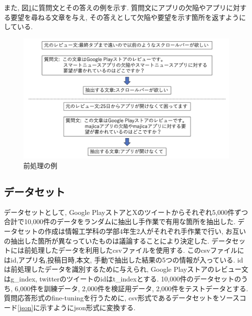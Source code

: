 また, 図\ref{chap:answer}に質問文とその答えの例を示す. 質問文にアプリの欠陥やアプリに対する要望を尋ねる文章を与え, その答えとして欠陥や要望を示す箇所を返すようにしている. 
\begin{figure}[hbtp]
  \centering
  \includegraphics[scale=0.4]
       {contents/images/answer.png}
  \caption{前処理の例\label{chap:answer}}
 \end{figure}
\subsection{データセット}
データセットとして, Google PlayストアとXのツイートからそれぞれ5,000件ずつ合計で10,000件のデータをランダムに抽出し手作業で有用な箇所を抽出した. データセットの作成は情報工学科の学部4年生2人がそれぞれ手作業で行い, お互いの抽出した箇所が異なっていたものは議論することにより決定した. 
データセットには前処理したデータを利用したcsvファイルを使用する. このcsvファイルにはid,アプリ名,投稿日時,本文, 手動で抽出した結果の5つの情報が入っている. idは前処理したデータを識別するために与えられ, Google Playストアのレビュー文はg\_{index}, twitterのツイートのidはt\_{index}とする. 
10,000件のデータセットのうち, 6,000件を訓練データ, 2,000件を検証用データ, 2,000件をテストデータとする. 質問応答形式のfine-tuningを行うために, csv形式であるデータセットをソースコード\ref{json}に示すようにjson形式に変換する. 


